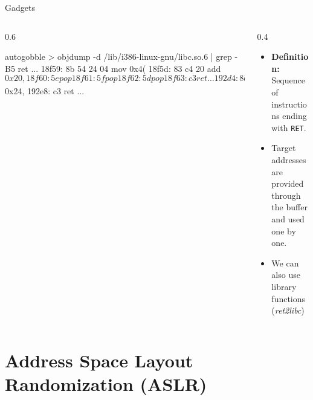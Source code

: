 \documentclass[beamer]{uibk}
\begin{document}
\begin{frame}[fragile]{Gadgets}
    \begin{columns}
        \begin{column}{0.6\textwidth}
            \begin{pre*}{autogobble}
                > objdump -d /lib/i386-linux-gnu/libc.so.6 | grep -B5 ret
                  ...
                18f59:       8b 54 24 04             mov    0x4(%
                18f5d:       83 c4 20                add    $0x20,%
                18f60:       5e                      pop    %
                18f61:       5f                      pop    %
                18f62:       5d                      pop    %
                18f63:       c3                      ret
                  ...
                192d4:       8b 54 24 2c             mov    0x2c(%
                192d8:       e8 23 fc ff ff          call   18f00 <__floatdidf+0x30>
                192dd:       8b 44 24 18             mov    0x18(%
                192e1:       8b 54 24 1c             mov    0x1c(%
                192e5:       83 c4 24                add    $0x24,%
                192e8:       c3                      ret
                  ...
            \end{pre*}
        \end{column}
        \begin{column}{0.4\textwidth}
            \begin{itemize}
                \item \textbf{Definition:} Sequence of instructions ending with
                    \texttt{RET}.
                \bigskip
                \item Target addresses are provided through the buffer and used
                    one by one.
                \bigskip
                \item We can also use library functions (\textit{ret2libc})
            \end{itemize}
        \end{column}
    \end{columns}
\end{frame}

\section{Address Space Layout Randomization (ASLR)}
\end{document}
